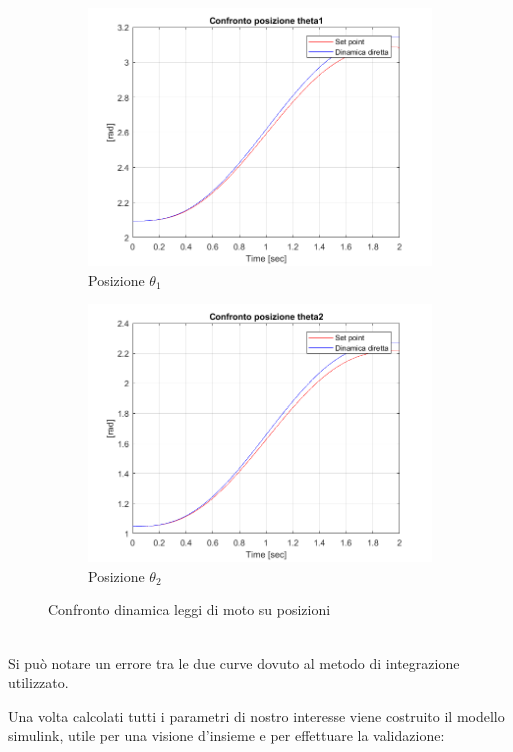 \begin{figure}[!ht]
\begin{subfigure}{.45\textwidth}
  \centering
  \includegraphics[width=.78\linewidth]{Immagini/Dinamica/confrpost1new.png}  
  \caption{Posizione $\theta_1$}
  \label{fig:sub-firsta}
\end{subfigure}
\begin{subfigure}{.45\textwidth}
  \centering
  \includegraphics[width=.78\linewidth]{Immagini/Dinamica/confrpost2new.png}  
  \caption{Posizione $\theta_2$}
  \label{fig:sub-seconda}
\end{subfigure}
\caption{Confronto dinamica leggi di moto su posizioni}
\end{figure}
\\Si può notare un errore tra le due curve dovuto al metodo di integrazione utilizzato.
\par Una volta calcolati tutti i parametri di nostro interesse viene costruito il modello simulink, utile per una visione d'insieme e per effettuare la validazione:
